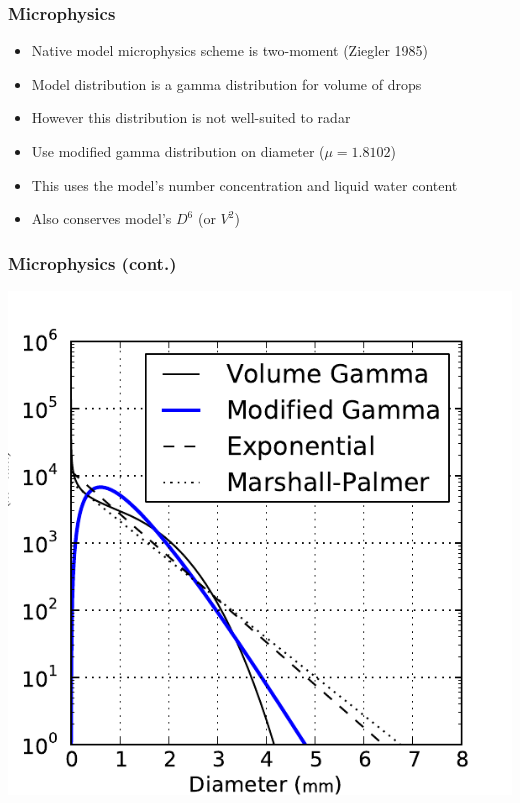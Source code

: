 \documentclass[red]{beamer}
\begin{document}
\begin{frame}
	\frametitle{Microphysics}
	\begin{itemize}
		\item Native model microphysics scheme is two-moment (Ziegler 1985)
		\item Model distribution is a gamma distribution for volume of drops
		\item However this distribution is not well-suited to radar
		\item Use modified gamma distribution on diameter ($\mu=1.8102$)
		\item This uses the model's number concentration and liquid water content
		\item Also conserves model's $D^6$ (or $V^2$)
	\end{itemize}
\end{frame}

\begin{frame}
	\frametitle{Microphysics (cont.)}
	\begin{center}
		\includegraphics[scale=0.6]{figures/distribution-comparison.pdf}
	\end{center}
\end{frame}
\end{document}

